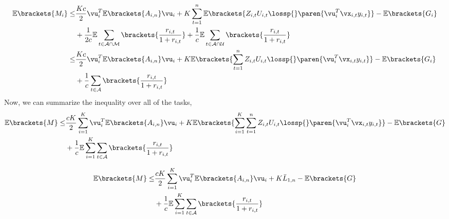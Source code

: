 \begin{equation*}
\begin{split}
\mathbb{E}\brackets{M_{i}}\le&\frac{Kc}{2} \vu_i^T \mathbb{E}\brackets{A_{i,n}} \vu_i+K\sum_{t=1}^{n}\mathbb{E}\brackets{{Z_{i,t}U_{i,t}\lossp{}\paren{\vu_i^T\vx_{i,t}y_{i,t}}}} -\mathbb{E}\brackets{G_{i}}\\
&+\frac{1}{2c}\mathbb{E}\sum_{t\in\mathcal{A\cap M}}\brackets{\frac{r_{i,t}}{1+r_{i,t}}}
+\frac{1}{c}\mathbb{E}\sum_{t\in\mathcal{A\cap U}}\brackets{\frac{r_{i,t}}{1+r_{i,t}}}\\
\le& \frac{Kc}{2} \vu_i^T \mathbb{E}\brackets{A_{i,n}} \vu_i+K\mathbb{E}\brackets{\sum_{t=1}^{n}{Z_{i,t}U_{i,t}\lossp{}\paren{\vu_i^T\vx_{i,t}y_{i,t}}}}-\mathbb{E}\brackets{G_{i}}\\
&+\frac{1}{c}\sum_{t\in\mathcal{A}}\brackets{\frac{r_{i,t}}{1+r_{i,t}}}
\end{split}
\end{equation*}
Now, we can summarize the inequality over all of the tasks,
\begin{equation*}
\begin{split}
\mathbb{E}\brackets{M}\le &\frac{cK}{2}\sum_{i=1}^{K}  \vu_i^T \mathbb{E}\brackets{A_{i,n}} \vu_i+K\mathbb{E}\brackets{\sum_{i=1}^{K}\sum_{t=1}^{n}Z_{i,t}U_{i,t}{\lossp{}\paren{\vu_i^T\vx_{i,t}y_{i,t}}}}-\mathbb{E}\brackets{G}\\
&+\frac{1}{c}\mathbb{E}\sum_{i=1}^{K}\sum_{t\in\mathcal{A}}\brackets{\frac{r_{i,t}}{1+r_{i,t}}}
\end{split}
\end{equation*}
 
\begin{equation*}
\begin{split}
\mathbb{E}\brackets{M}\le &\frac{cK}{2}\sum_{i=1}^{K}  \vu_i^T \mathbb{E}\brackets{A_{i,n}} \vu_i+K{\bar L}_{1,n}-\mathbb{E}\brackets{G}\\
&+\frac{1}{c}\mathbb{E}\sum_{i=1}^{K}\sum_{t\in\mathcal{A}}\brackets{\frac{r_{i,t}}{1+r_{i,t}}}
\end{split}
\end{equation*} 



